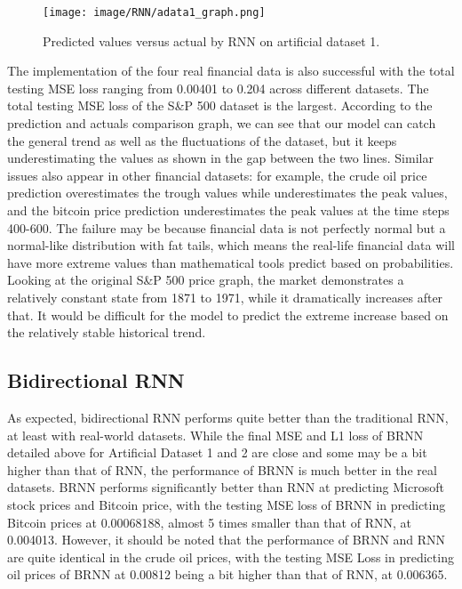 \documentclass[letterpaper, 10 pt, conference]{ieeeconf}  %
\begin{document}
        \begin{figure}[thpb]
            \centering
             \texttt{[image: image/RNN/adata1\_graph.png]}
            \caption{Predicted values versus actual by RNN on artificial dataset 1.}
            \label{figurelabel}
        \end{figure}

        The implementation of the four real financial data is also successful with the total testing MSE loss ranging from 0.00401 to 0.204 across different datasets. The total testing MSE loss of the S\&P 500 dataset is the largest. According to the prediction and actuals comparison graph, we can see that our model can catch the general trend as well as the fluctuations of the dataset, but it keeps underestimating the values as shown in the gap between the two lines. Similar issues also appear in other financial datasets: for example, the crude oil price prediction overestimates the trough values while underestimates the peak values, and the bitcoin price prediction underestimates the peak values at the time steps 400-600. The failure may be because financial data is not perfectly normal but a normal-like distribution with fat tails, which means the real-life financial data will have more extreme values than mathematical tools predict based on probabilities. Looking at the original S\&P 500 price graph, the market demonstrates a relatively constant state from 1871 to 1971, while it dramatically increases after that. It would be difficult for the model to predict the extreme increase based on the relatively stable historical trend. 


    \subsection{Bidirectional RNN}

        As expected, bidirectional RNN performs quite better than the traditional RNN, at least with real-world datasets. While the final MSE and L1 loss of BRNN detailed above for Artificial Dataset 1 and 2 are close and some may be a bit higher than that of RNN, the performance of BRNN is much better in the real datasets. BRNN performs significantly better than RNN at predicting Microsoft stock prices and Bitcoin price, with the testing MSE loss of BRNN in predicting Bitcoin prices at 0.00068188, almost 5 times smaller than that of RNN, at 0.004013. However, it should be noted that the performance of BRNN and RNN are quite identical in the crude oil prices, with the testing MSE Loss in predicting oil prices of BRNN at 0.00812 being a bit higher than that of RNN, at 0.006365.
\end{document}

